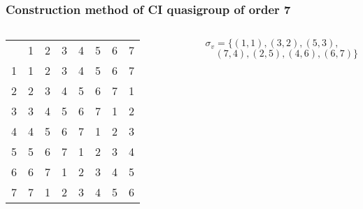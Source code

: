 \begin{frame}
\frametitle{Construction method of CI quasigroup of order 7}
\begin{columns}
	\begin{table}[]
		\begin{tabular}{llllllll}
			& 1                      & 2                      & 3                      & 4                      & 5                      & 6                      & 7                      \\ \cline{2-8} 
			\multicolumn{1}{l|}{1} & \multicolumn{1}{l|}{1} & \multicolumn{1}{l|}{2} & \multicolumn{1}{l|}{3} & \multicolumn{1}{l|}{4} & \multicolumn{1}{l|}{5} & \multicolumn{1}{l|}{6} & \multicolumn{1}{l|}{7} \\ \cline{2-8} 
			\multicolumn{1}{l|}{2} & \multicolumn{1}{l|}{2} & \multicolumn{1}{l|}{3} & \multicolumn{1}{l|}{4} & \multicolumn{1}{l|}{5} & \multicolumn{1}{l|}{6} & \multicolumn{1}{l|}{7} & \multicolumn{1}{l|}{1} \\ \cline{2-8} 
			\multicolumn{1}{l|}{3} & \multicolumn{1}{l|}{3} & \multicolumn{1}{l|}{4} & \multicolumn{1}{l|}{5} & \multicolumn{1}{l|}{6} & \multicolumn{1}{l|}{7} & \multicolumn{1}{l|}{1} & \multicolumn{1}{l|}{2} \\ \cline{2-8} 
			\multicolumn{1}{l|}{4} & \multicolumn{1}{l|}{4} & \multicolumn{1}{l|}{5} & \multicolumn{1}{l|}{6} & \multicolumn{1}{l|}{7} & \multicolumn{1}{l|}{1} & \multicolumn{1}{l|}{2} & \multicolumn{1}{l|}{3} \\ \cline{2-8} 
			\multicolumn{1}{l|}{5} & \multicolumn{1}{l|}{5} & \multicolumn{1}{l|}{6} & \multicolumn{1}{l|}{7} & \multicolumn{1}{l|}{1} & \multicolumn{1}{l|}{2} & \multicolumn{1}{l|}{3} & \multicolumn{1}{l|}{4} \\ \cline{2-8} 
			\multicolumn{1}{l|}{6} & \multicolumn{1}{l|}{6} & \multicolumn{1}{l|}{7} & \multicolumn{1}{l|}{1} & \multicolumn{1}{l|}{2} & \multicolumn{1}{l|}{3} & \multicolumn{1}{l|}{4} & \multicolumn{1}{l|}{5} \\ \cline{2-8} 
			\multicolumn{1}{l|}{7} & \multicolumn{1}{l|}{7} & \multicolumn{1}{l|}{1} & \multicolumn{1}{l|}{2} & \multicolumn{1}{l|}{3} & \multicolumn{1}{l|}{4} & \multicolumn{1}{l|}{5} & \multicolumn{1}{l|}{6} \\ \cline{2-8} 
		\end{tabular}
	\end{table}
	$\sigma_v = \{ (1,1), (3,2), (5,3),$ \\
	$ \quad (7,4), (2,5), (4,6), (6,7) \}$
\end{columns}


\end{frame}
